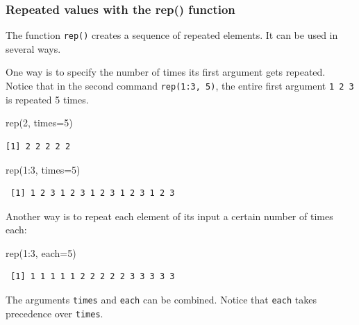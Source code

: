 \documentclass[
  13,
  letterpaper,
]{report}
\newenvironment{Shaded}{\begin{snugshade}}{\end{snugshade}}
\newcommand{\AttributeTok}[1]{\textcolor[rgb]{0.40,0.45,0.13}{#1}}
\newcommand{\DecValTok}[1]{\textcolor[rgb]{0.68,0.00,0.00}{#1}}
\newcommand{\FunctionTok}[1]{\textcolor[rgb]{0.28,0.35,0.67}{#1}}
\newcommand{\NormalTok}[1]{\textcolor[rgb]{0.00,0.23,0.31}{#1}}
\newcommand{\SpecialCharTok}[1]{\textcolor[rgb]{0.37,0.37,0.37}{#1}}
\begin{document}
\subsubsection{Repeated values with the rep()
function}\label{sec-manip-make-seq-rep}

The function \texttt{rep()} creates a sequence of repeated elements. It
can be used in several ways.

One way is to specify the number of times its first argument gets
repeated. Notice that in the second command \texttt{rep(1:3,\ 5)}, the
entire first argument \texttt{1\ 2\ 3} is repeated 5 times.

\begin{Shaded}
\begin{Highlighting}[]
\FunctionTok{rep}\NormalTok{(}\DecValTok{2}\NormalTok{, }\AttributeTok{times=}\DecValTok{5}\NormalTok{)}
\end{Highlighting}
\end{Shaded}

\begin{verbatim}
[1] 2 2 2 2 2
\end{verbatim}

\begin{Shaded}
\begin{Highlighting}[]
\FunctionTok{rep}\NormalTok{(}\DecValTok{1}\SpecialCharTok{:}\DecValTok{3}\NormalTok{, }\AttributeTok{times=}\DecValTok{5}\NormalTok{)}
\end{Highlighting}
\end{Shaded}

\begin{verbatim}
 [1] 1 2 3 1 2 3 1 2 3 1 2 3 1 2 3
\end{verbatim}

Another way is to repeat each element of its input a certain number of
times each:

\begin{Shaded}
\begin{Highlighting}[]
\FunctionTok{rep}\NormalTok{(}\DecValTok{1}\SpecialCharTok{:}\DecValTok{3}\NormalTok{, }\AttributeTok{each=}\DecValTok{5}\NormalTok{)}
\end{Highlighting}
\end{Shaded}

\begin{verbatim}
 [1] 1 1 1 1 1 2 2 2 2 2 3 3 3 3 3
\end{verbatim}

The arguments \texttt{times} and \texttt{each} can be combined. Notice
that \texttt{each} takes precedence over \texttt{times}.
\end{document}
